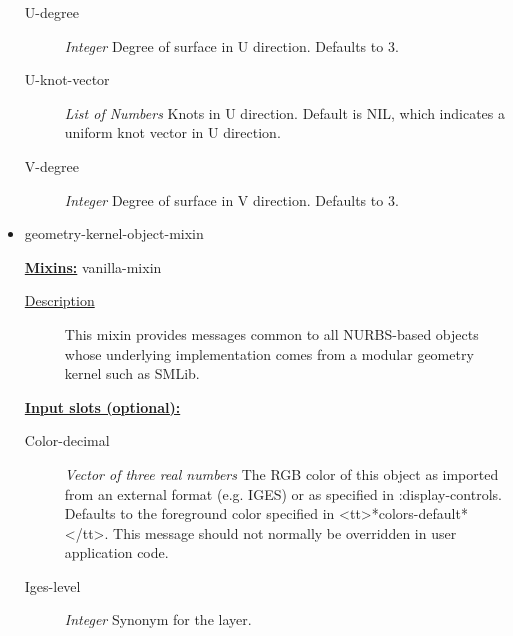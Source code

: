 \documentclass [11pt]{book}
\begin{document}
\begin{itemize}
\begin{description}
\item [U-degree]
\emph{Integer} Degree of surface in U direction. Defaults to 3.


\item [U-knot-vector]
\emph{List of Numbers} Knots in U direction. Default is NIL, which indicates a uniform knot vector in U direction.


\item [V-degree]
\emph{Integer} Degree of surface in V direction. Defaults to 3.


\end{description}







\item {}geometry-kernel-object-mixin


\textbf{
\underline{Mixins:}} vanilla-mixin





\begin{description}

\item [
\underline{Description}]


This mixin provides messages common to all NURBS-based objects whose underlying implementation
comes from a modular geometry kernel such as SMLib.



\end{description}








\textbf{
\underline{Input slots (optional):}}

\begin{description}

\item [Color-decimal]
\emph{Vector of three real numbers} The RGB color of this object as imported from an external format (e.g. IGES) or as specified in :display-controls.
Defaults to the foreground color specified in <tt>*colors-default*</tt>. This message should not normally be overridden in user application code.


\item [Iges-level]
\emph{Integer} Synonym for the layer.



\end{description}
\end{itemize}
\end{document}
